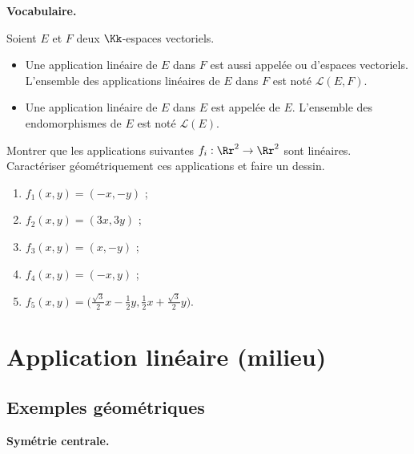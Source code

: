 \documentclass[class=report,crop=false]{standalone}
\begin{document}
\textbf{Vocabulaire.}

Soient $E$ et $F$ deux $\Kk$-espaces vectoriels.

\begin{itemize}
  \item Une application linéaire de $E$ dans $F$ est
  aussi appelée  ou  d'espaces vectoriels.
  L'ensemble des applications linéaires de $E$ dans $F$ est noté $\mathcal{L}(E,F)$.

  \item Une application linéaire de $E$ dans $E$ est appelée  de $E$.
   L'ensemble des endomorphismes de $E$ est noté  $\mathcal{L}(E)$.
\end{itemize}



\begin{miniexercices}
Montrer que les applications suivantes $f_i : \Rr^2 \to \Rr^2$ sont linéaires.
Caractériser géométriquement ces applications et faire un dessin.
   \begin{enumerate}
    \item $f_1(x,y)=(-x,-y)$ ;
    \item $f_2(x,y) = (3x,3y)$ ;
    \item $f_3(x,y)=(x,-y)$ ;
    \item $f_4(x,y)=(-x,y)$ ;
    \item $f_5(x,y)=\big(\frac{\sqrt 3}{2}x-\frac12y, \frac12x +\frac{\sqrt 3}{2}y\big)$.
  \end{enumerate}
\end{miniexercices}
  
\section{Application linéaire (milieu)}


\subsection{Exemples géométriques}

\textbf{Symétrie centrale.}
\end{document}
